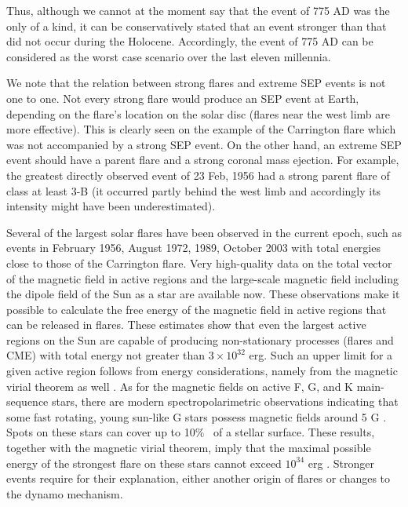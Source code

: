\documentclass[fleqn,12pt]{SelfArx} %
\begin{document}
Thus, although we cannot at the moment say that the event of 775 AD was the only of a kind, it can be 
conservatively stated that
 an event stronger than that did not occur during the Holocene.
Accordingly, the event of 775 AD can be considered as the worst case scenario over the last eleven millennia.

We note that the relation between strong flares and extreme SEP events is not one to one.
Not every strong flare would produce an SEP event at Earth, depending on the flare's location on the solar disc 
(flares near the west
 limb are more effective).
This is clearly seen on the example of the Carrington flare which was not accompanied by a strong SEP event.
On the other hand, an extreme SEP event should have a parent flare and a strong coronal mass ejection.
For example, the greatest directly observed event of 23 Feb, 1956 had a strong parent flare of class at least 3-B 
(it occurred partly behind
 the west limb and accordingly its intensity might have been underestimated).

Several of the largest solar flares have been observed in the current epoch, such as events in February 1956, 
August 1972, 1989, October 2003
 with total energies close to those of the Carrington flare. 
Very high-quality data on the total vector of the magnetic field in active regions and the large-scale magnetic 
field including the dipole field of the Sun as a star
 are available now. 
These observations make it possible to calculate the free energy of the magnetic field in active regions that can 
be released in flares. 
These estimates show that even the largest active regions on the Sun are capable of producing non-stationary 
processes (flares and CME) with
 total energy not greater than $3 \times 10^{32}$ erg. 
Such an upper limit for a given active region follows  from energy considerations, namely from the magnetic 
virial theorem as well \cite{27}.
As for the magnetic fields on active F, G, and K main-sequence stars, there are modern spectropolarimetric
observations indicating that some fast rotating, young sun-like G stars possess magnetic fields around 5 G \cite{28}. 
Spots on these stars can cover up to 10\%~ of a stellar surface. 
These results, together with the magnetic virial theorem, imply that the maximal
possible energy of the strongest flare on these stars cannot exceed  $10^{34}$ erg \cite{29}.
Stronger events require for their explanation, either another origin of flares or changes to the dynamo 
mechanism.
\end{document}

